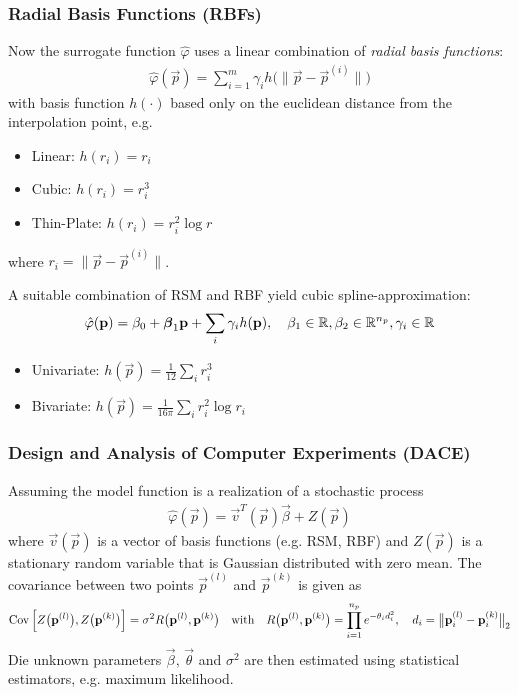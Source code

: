 			\subsubsection{Radial Basis Functions (RBFs)}
				Now the surrogate function \( \hat{\varphi} \) uses a linear combination of \emph{radial basis functions}:
				\begin{align*}
					\hat{\varphi}(\vec{p}) = \sum_{i = 1}^{m} \gamma_i h\Big( \big\lVert \vec{p} - \vec{p}^{(i)} \big\rVert \Big)
				\end{align*}
				with basis function \( h(\cdot) \) based only on the euclidean distance from the interpolation point, e.g.
				\begin{itemize}
					\item Linear: \tabto{2cm} \( h(r_i) = r_i \)
					\item Cubic: \tabto{2cm} \( h(r_i) = r_i^3 \)
					\item Thin-Plate: \tabto{2cm} \( h(r_i) = r_i^2 \log r \)
				\end{itemize}
				where \( r_i = \big\lVert \vec{p} - \vec{p}^{(i)} \big\rVert \).
				
				A suitable combination of RSM and RBF yield cubic spline-approximation:
				\begin{align*}
					\hat{\varphi}(\boldsymbol{\mathrm{p}}) = \beta_0 + \boldsymbol{\mathrm{\beta}}_1 \boldsymbol{\mathrm{p}} + \sum_i \gamma_i h(\boldsymbol{\mathrm{p}}),\quad \beta_1 \in \mathbb{R}, \beta_2 \in \mathbb{R}^{n_p}, \gamma_i \in \mathbb{R}
				\end{align*}
				\begin{itemize}
					\item Univariate: \tabto{2cm} \( h(\vec{p}) = \frac{1}{12} \sum_i r_i^3 \)
					\item Bivariate: \tabto{2cm} \( h(\vec{p}) = \frac{1}{16 \pi} \sum_i r_i^2 \log r_i \)
				\end{itemize}

			\subsubsection{Design and Analysis of Computer Experiments (DACE)}
				Assuming the model function is a realization of a stochastic process
				\begin{align*}
					\hat{\varphi}(\vec{p}) = \vec{v}^T(\vec{p}) \vec{\beta} + Z(\vec{p})
				\end{align*}
				where \( \vec{v}(\vec{p}) \) is a vector of basis functions (e.g. RSM, RBF) and \( Z(\vec{p}) \) is a stationary random variable that is Gaussian distributed with zero mean. The covariance between two points \( \vec{p}^{(l)} \) and \( \vec{p}^{(k)} \) is given as
				\begin{align*}
					\operatorname{Cov}\Big[ Z\big(\boldsymbol{\mathrm{p}}^{(l)}\big), Z\big(\boldsymbol{\mathrm{p}}^{(k)}\big) \Big] = \sigma^2 R\big(\boldsymbol{\mathrm{p}}^{(l)}, \boldsymbol{\mathrm{p}}^{(k)}\big)
					\quad\text{with}\quad
					R\big(\boldsymbol{\mathrm{p}}^{(l)}, \boldsymbol{\mathrm{p}}^{(k)}\big) = \prod_{i = 1}^{n_p} e^{-\theta_i d_i^2},\quad d_i = \big\lVert \boldsymbol{\mathrm{p}}_i^{(l)} - \boldsymbol{\mathrm{p}}_i^{(k)} \big\rVert_2
				\end{align*}
				Die unknown parameters \(\vec{\beta}\), \(\vec{\theta}\) and \(\sigma^2\) are then estimated using statistical estimators, e.g. maximum likelihood.

